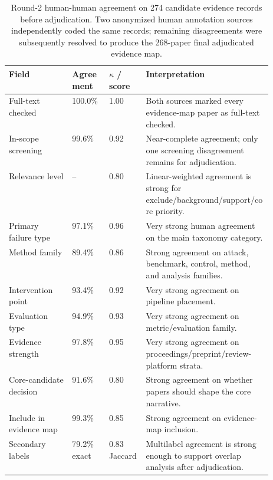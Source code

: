\begin{table}[t]
\centering
\scriptsize
\begin{tabularx}{\linewidth}{p{0.24\linewidth}p{0.14\linewidth}p{0.14\linewidth}X}
\toprule
\textbf{Field} & \textbf{Agreement} & \textbf{$\kappa$ / score} & \textbf{Interpretation} \\
\midrule
Full-text checked & 100.0\% & 1.00 & Both sources marked every evidence-map paper as full-text checked. \\
In-scope screening & 99.6\% & 0.92 & Near-complete agreement; only one screening disagreement remains for adjudication. \\
Relevance level & -- & 0.80 & Linear-weighted agreement is strong for exclude/background/support/core priority. \\
Primary failure type & 97.1\% & 0.96 & Very strong human agreement on the main taxonomy category. \\
Method family & 89.4\% & 0.86 & Strong agreement on attack, benchmark, control, method, and analysis families. \\
Intervention point & 93.4\% & 0.92 & Very strong agreement on pipeline placement. \\
Evaluation type & 94.9\% & 0.93 & Very strong agreement on metric/evaluation family. \\
Evidence strength & 97.8\% & 0.95 & Very strong agreement on proceedings/preprint/review-platform strata. \\
Core-candidate decision & 91.6\% & 0.80 & Strong agreement on whether papers should shape the core narrative. \\
Include in evidence map & 99.3\% & 0.85 & Strong agreement on evidence-map inclusion. \\
Secondary labels & 79.2\% exact & 0.83 Jaccard & Multilabel agreement is strong enough to support overlap analysis after adjudication. \\
\bottomrule
\end{tabularx}
\caption{Round-2 human-human agreement on 274 candidate evidence records before adjudication. Two anonymized human annotation sources independently coded the same records; remaining disagreements were subsequently resolved to produce the 268-paper final adjudicated evidence map.}
\label{tab:iaa}
\end{table}
